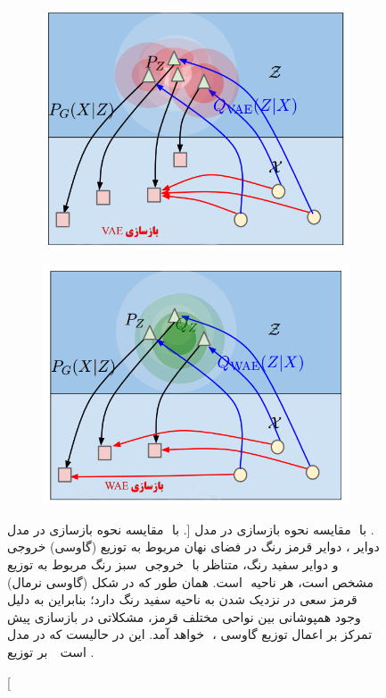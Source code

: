\begin{figure}[H]
	\centering
	\begin{subfigure}[b]{0.4\textwidth}
		\includegraphics[width=\textwidth]{images/wae1.png}
		\caption{\vae}
		\label{fig:wae-vae}
	\end{subfigure}
	\begin{subfigure}[b]{0.4\textwidth}
		\includegraphics[width=\textwidth]{images/wae2.png}
		\caption{\wae}
		\label{fig:wae-wae}
	\end{subfigure}
	\caption
    [مقایسه نحوه بازسازی در مدل  ‎‎\wae{}‎ با ‎\vae{}‎.]
    {
		مقایسه نحوه بازسازی در مدل  ‎‎\wae{}‎ با ‎\vae{}‎. دوایر قرمز رنگ در فضای نهان مربوط به توزیع (گاوسی) خروجی ‎\encoder{}‎، دوایر سبز رنگ مربوط به توزیع ‎‎\marginal{}‎ خروجی ‎\encoder{}‎ و  دوایر سفید رنگ، متناظر با ‎\priordist{}‎ (گاوسی نرمال) است. همان طور که در شکل ‎‎ مشخص است، هر ناحیه قرمز سعی در نزدیک شدن به ناحیه سفید رنگ دارد؛ بنابراین به دلیل وجود همپوشانی بین نواحی مختلف قرمز، مشکلاتی در بازسازی پیش خواهد آمد. این در حالیست که در مدل ‎\wae{}‎ ، تمرکز بر اعمال توزیع گاوسی بر توزیع ‎\marginal{}‎ \encoder{}‎‎ است \cite{wae}.
	}
	\label{fig:wae}
\end{figure}
